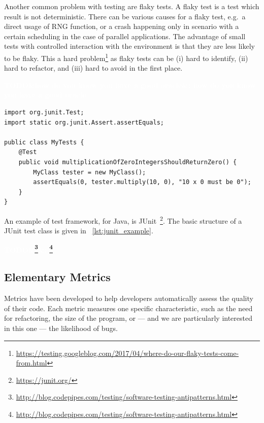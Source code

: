 \documentclass[a4paper,11pt]{sdm_internship}
\newcommand{\todo}[1]{\colorbox{Red!75}{\textcolor{white}{\textbf{TODO\ifx&#1&\else: #1\fi}}}}
\theoremstyle{definition}
\begin{document}
Another common problem with testing are flaky tests.
A flaky test is a test which result is not deterministic.
There can be various causes for a flaky test, e.g.\ a direct usage of RNG function, or a crash happening only in scenario with a certain scheduling in the case of parallel applications.
The advantage of small tests with controlled interaction with the environment is that they are less likely to be flaky.
This a hard problem\footnote{\url{https://testing.googleblog.com/2017/04/where-do-our-flaky-tests-come-from.html}} as flaky tests can be (i) hard to identify, (ii) hard to refactor, and (iii) hard to avoid in the first place.

\todo{how do you know you have a good oracle}

\begin{listing}
  \centering
  \begin{verbatim}
import org.junit.Test;
import static org.junit.Assert.assertEquals;

public class MyTests {
    @Test
    public void multiplicationOfZeroIntegersShouldReturnZero() {
        MyClass tester = new MyClass();
        assertEquals(0, tester.multiply(10, 0), "10 x 0 must be 0");
    }
}
  \end{verbatim}
  \caption{Example of a JUnit test class. A test class is simply a group of test methods (i.e.\ test cases). Each test case is identified by the annotation \texttt{@Test}.}%
\label{lst:junit_example}
\end{listing}
An example of test framework, for Java, is JUnit~\footnote{\url{https://junit.org/}}.
The basic structure of a JUnit test class is given in \listingname~\ref{lst:junit_example}.

\todo{\footnote{\url{http://blog.codepipes.com/testing/software-testing-antipatterns.html}}}

\subsection{Elementary Metrics}%
\label{ssec:elementary_metrics}
Metrics have been developed to help developers automatically assess the quality of their code.
Each metric measures one specific characteristic, such as the need for refactoring, the size of the program, or --- and we are particularly interested in this one --- the likelihood of bugs.
\end{document}
